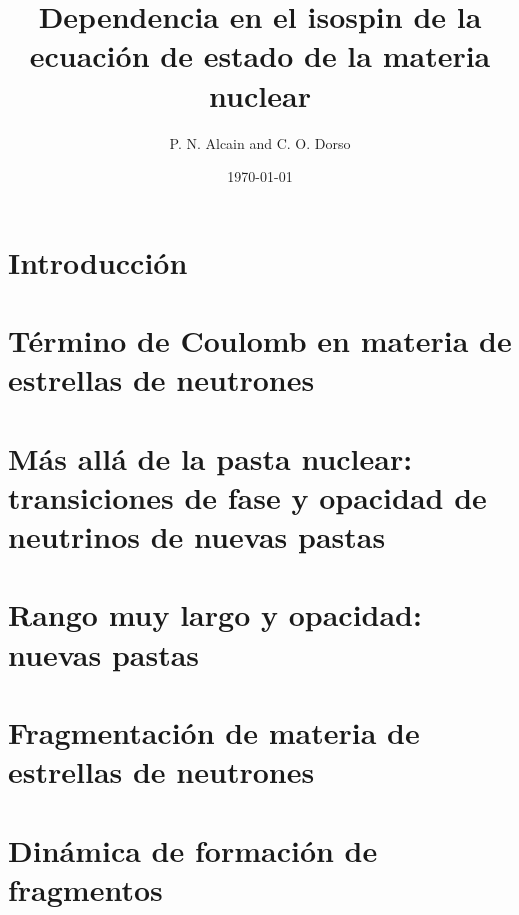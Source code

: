 \documentclass[12pt]{book}
\begin{document}
\title{Dependencia en el isospin de la ecuación de estado de la materia nuclear}

\author{P. N. Alcain and C. O. Dorso}

\date{\today}
\maketitle
\tableofcontents

\chapter[Introducción]{Introducción}
\label{ch:introduccion}



\chapter[Efecto de Coulomb]{Término de Coulomb en materia de estrellas de neutrones}
\label{ch:coulomb}


\chapter[Transiciones de fase]{Más allá de la pasta nuclear: transiciones de fase y opacidad de neutrinos de nuevas pastas}
\label{ch:transicion}


\chapter[Nuevas pastas]{Rango muy largo y opacidad: nuevas pastas}
\label{ch:nuevas_pastas}


\chapter[Fragmentación]{Fragmentación de materia de estrellas de neutrones}
\label{ch:fragmentacion}


\chapter[Formación de fragmentos]{Dinámica de formación de fragmentos}
\label{ch:dinamica}


\label{ap:minkowski}



\end{document}
